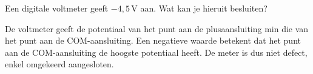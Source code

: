 \documentclass{ximera}
\begin{document}
\begin{question}
    Een digitale voltmeter geeft $-4{,}5 \, \mathrm{V}$ aan. Wat kan je hieruit besluiten?

    \begin{multipleChoice}
    \end{multipleChoice}

    \begin{solution}\nl
        De voltmeter geeft de potentiaal van het punt aan de plusaansluiting min die van het punt aan de COM-aansluiting. Een negatieve waarde betekent dat het punt aan de COM-aansluiting de hoogste potentiaal heeft. De meter is dus niet defect, enkel omgekeerd aangesloten.
    \end{solution}
\end{question}
\end{document}
